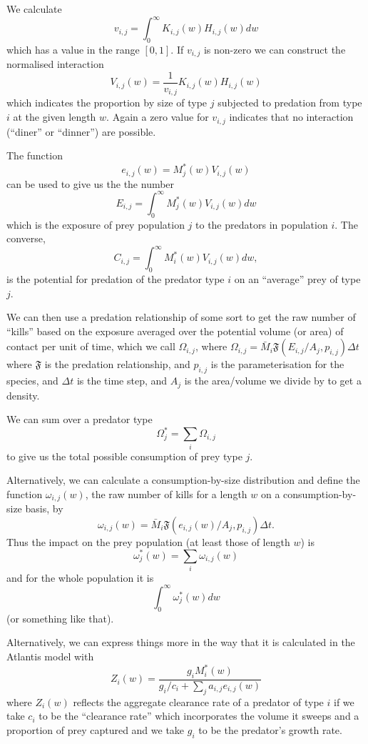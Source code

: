 We calculate
\[ v_{i,j} = \int_0^{\infty} K_{i,j} (w) H_{i,j} (w) dw \]
which has a value in the range $[0, 1]$. If $v_{i,j}$ is non-zero we can
construct the normalised interaction
\[ V_{i,j} (w) = \frac{1}{v_{i,j}} K_{i,j} (w) H_{i,j} (w) \]
which indicates the proportion by size of type $j$ subjected to predation from
type $i$ at the given length $w$. Again a zero value for $v_{i,j}$ indicates
that no interaction (``diner'' or ``dinner'') are possible.



The function
\[ e_{i,j} (w) = M^{\ast}_j (w) V_{i,j} (w)  \]
can be used to give us the the number
\[ E_{i,j} = \int_0^{\infty} M^{\ast}_j (w) V_{i,j} (w) d w \]
which is the exposure of prey population $j$ to the predators in
population $i$. The converse,
\[ C_{i,j} = \int_0^{\infty} M_i^{\ast} (w) V_{i,j} (w) d w, \]
is the potential for predation of the predator type $i$ on an ``average'' prey
of type $j$.

We can then use a predation relationship of some sort to get the raw
number of ``kills'' based on the exposure averaged over the potential
volume (or area) of contact per unit of time, which we call $\Omega_{i,j}$, where $\Omega_{i,j} = \bar{M}_i \mathfrak{F} (E_{i,j} / A_j,
p_{i,j}) \Delta t$ where $\mathfrak{F}$ is the predation relationship,
and $p_{i,j}$ is the parameterisation for the species, and $\Delta t$
is the time step, and $A_j$ is the area/volume we divide by to get a
density.

We can sum over a predator type
\[ \Omega_j^{\ast} = \sum_i \Omega_{i,j} \]
to give us the total possible consumption of prey type $j$.

Alternatively, we can calculate a consumption-by-size distribution and define
the function $\omega_{i,j} (w)$, the raw number of kills for a length $w$ on a
consumption-by-size basis, by
\[ \omega_{i,j} (w) = \bar{M}_i \mathfrak{F} (e_{i,j} (w) / A_j, p_{i,j})
   \Delta t. \]
Thus the impact on the prey population (at least those of length $w$) is
\[ \omega_j^{\ast} (w) = \sum_i \omega_{i,j} (w) \]
and for the whole population it is
\[ \int_0^{\infty} \omega^{\ast}_j (w) d w \]
(or something like that).

Alternatively, we can express things more in the way that it is
calculated in the Atlantis model \citep{Fulton2011pcomm} with
\[ Z_i (w) = \frac{g_i M^{\ast}_i (w)}{g_i / c_i + \sum_j a_{i,j} e_{i,j} (w)}
\]
where $Z_i (w)$ reflects the aggregate clearance rate of a predator of type
$i$ if we take $c_i$ to be the ``clearance rate'' which incorporates the
volume it sweeps and a proportion of prey captured and we take $g_i$ to be the
predator's growth rate.

